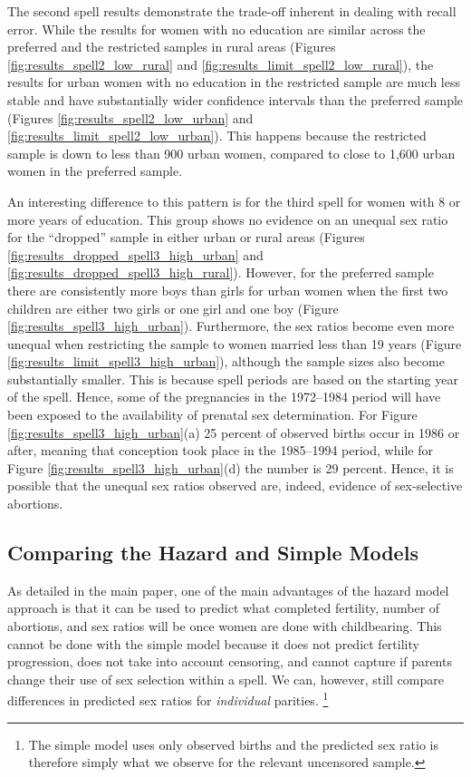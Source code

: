 \documentclass[12pt,letterpaper]{article}
\begin{document}
The second spell results demonstrate the trade-off inherent in dealing with recall error.
While the results for women with no education are similar across the preferred and the
restricted samples in rural areas (Figures \ref{fig:results_spell2_low_rural} and
\ref{fig:results_limit_spell2_low_rural}), the results for urban women with no 
education in the restricted sample are much less stable and have substantially wider
confidence intervals than the preferred sample (Figures \ref{fig:results_spell2_low_urban}
and \ref{fig:results_limit_spell2_low_urban}).
This happens because the restricted sample is down to less than 900 urban women, compared
to close to 1,600 urban women in the preferred sample.

An interesting difference to this pattern is for the third spell for women with 8 or more
years of education.
This group shows no evidence on an unequal sex ratio for the ``dropped'' sample in 
either urban or rural areas (Figures \ref{fig:results_dropped_spell3_high_urban} and
\ref{fig:results_dropped_spell3_high_rural}).
However, for the preferred sample there are consistently more boys than girls for urban
women when the first two children are either two girls or one girl and one boy (Figure 
\ref{fig:results_spell3_high_urban}).
Furthermore, the sex ratios become even more unequal when restricting the sample to
women married less than 19 years (Figure \ref{fig:results_limit_spell3_high_urban}), 
although the sample sizes also become substantially smaller.
This is because spell periods are based on the starting year of the spell.
Hence, some of the pregnancies in the 1972--1984 period will have been exposed to the  
availability of prenatal sex determination.
For Figure \ref{fig:results_spell3_high_urban}(a) 25 percent of observed births 
occur in  1986 or after, meaning that conception took place in the 1985--1994 period, 
while for Figure \ref{fig:results_spell3_high_urban}(d) the number is 29 percent.
Hence, it is possible that the unequal sex ratios observed are, indeed, evidence of 
sex-selective abortions.

\clearpage
\newpage

\subsection{Comparing the Hazard and Simple Models}

As detailed in the main paper, one of the main advantages of the hazard model 
approach is that it can be used to predict what completed fertility, number of abortions, 
and sex ratios will be once women are done with childbearing.
This cannot be done with the simple model because it does not predict fertility
progression, does not take into account censoring, and cannot capture if parents
change their use of sex selection within a spell.
We can, however, still compare differences in predicted sex ratios for 
\emph{individual} parities.%
\footnote{
The simple model uses only observed births and the predicted sex ratio is 
therefore simply what we observe for the relevant uncensored sample.
}
\end{document}
